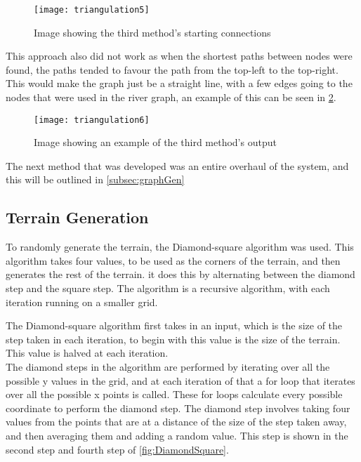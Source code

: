 \begin{figure}[H]
	\texttt{[image: triangulation5]}
	\centering
	\caption{Image showing the third method's starting connections}
	\label{fig:triangulation5}
\end{figure}
	
	This approach also did not work as when the shortest paths between nodes were found, the paths tended to favour the path from the top-left to the top-right. This would make the graph just be a straight line, with a few edges going to the nodes that were used in the river graph, an example of this can be seen in \ref{fig:triangulation6}.

\begin{figure}[H]
	\texttt{[image: triangulation6]}
	\centering
	\caption{Image showing an example of the third method's output}
	\label{fig:triangulation6}
\end{figure}

	The next method that was developed was an entire overhaul of the system, and this will be outlined in \ref{subsec:graphGen}



\subsection{Terrain Generation}
	To randomly generate the terrain, the Diamond-square algorithm was used. This algorithm takes four values, to be used as the corners of the terrain, and then generates the rest of the terrain. it does this by alternating between the diamond step and the square step. The algorithm is a recursive algorithm, with each iteration running on a smaller grid.
	\newline
	\par
	The Diamond-square algorithm first takes in an input, which is the size of the step taken in each iteration, to begin with this value is the size of the terrain. This value is halved at each iteration.\\


	The diamond steps in the algorithm are performed by iterating over all the possible y values in the grid, and at each iteration of that a for loop that iterates over all the possible x points is called. These for loops calculate every possible coordinate to perform the diamond step. The diamond step involves taking four values from the points that are at a distance of the size of the step taken away, and then averaging them and adding a random value. This step is shown in the second step and fourth step of \ref{fig:DiamondSquare}.\\

